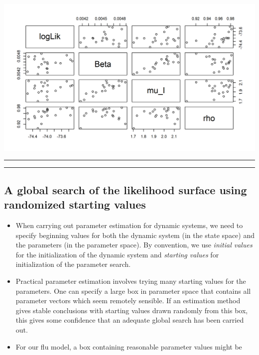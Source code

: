 \documentclass[]{article}
\begin{document}
\begin{center}\includegraphics{figure/notes12-pairs_local-1} \end{center}

\begin{center}\rule{0.5\linewidth}{\linethickness}\end{center}

\begin{center}\rule{0.5\linewidth}{\linethickness}\end{center}

\subsection{A global search of the likelihood surface using randomized
starting
values}\label{a-global-search-of-the-likelihood-surface-using-randomized-starting-values}

\begin{itemize}
\item
  When carrying out parameter estimation for dynamic systems, we need to
  specify beginning values for both the dynamic system (in the state
  space) and the parameters (in the parameter space). By convention, we
  use \emph{initial values} for the initialization of the dynamic system
  and \emph{starting values} for initialization of the parameter search.
\item
  Practical parameter estimation involves trying many starting values
  for the parameters. One can specify a large box in parameter space
  that contains all parameter vectors which seem remotely sensible. If
  an estimation method gives stable conclusions with starting values
  drawn randomly from this box, this gives some confidence that an
  adequate global search has been carried out.
\item
  For our flu model, a box containing reasonable parameter values might
  be
\end{itemize}
\end{document}
